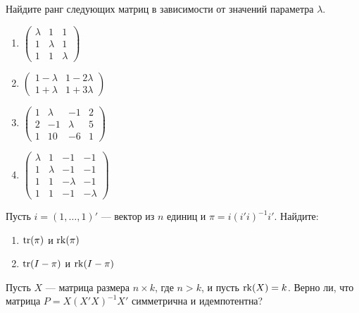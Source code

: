 \documentclass[pdftex,11pt,openany]{book}\usepackage[]{graphicx}\usepackage[]{color}
\begin{document}
\begin{solution}
\end{solution}


\begin{problem}
Найдите ранг следующих матриц в зависимости от значений параметра $\lambda$.

\begin{enumerate}
\item $\begin{pmatrix} \lambda & 1 & 1 \\ 1 & \lambda & 1 \\ 1 & 1 & \lambda \end{pmatrix}$
\item $\begin{pmatrix} 1-\lambda & 1-2\lambda \\ 1+\lambda & 1+3\lambda \end{pmatrix}$
\item $\begin{pmatrix} 1 & \lambda & -1 & 2 \\ 2 & -1 & \lambda & 5 \\ 1 & 10 & -6 & 1 \end{pmatrix}$
\item $\begin{pmatrix} \lambda & 1 & -1 & -1 \\ 1 & \lambda & -1 & -1 \\ 1 & 1 & -\lambda & -1
\\ 1 & 1 & -1 & -\lambda \end{pmatrix}$
\end{enumerate}
\end{problem}


\begin{solution}
\end{solution}



\begin{problem}
Пусть $i = (1,\dots,1)'$ --- вектор из $n$ единиц и $\pi=i(i'i)^{-1}i'$. Найдите:
\begin{enumerate}
\item $\operatorname{tr}(\pi)$ и $\operatorname{rk}(\pi)$
\item $\operatorname{tr}(I-\pi)$ и $\operatorname{rk}(I-\pi)$
\end{enumerate}
\end{problem}

\begin{solution}
\end{solution}

\begin{problem}
Пусть $X$ --- матрица размера ${n \times k}$, где $n > k$, и пусть $\operatorname{rk}(X) = k$. Верно ли, что матрица $P = X(X'X)^{-1}X'$ симметрична и идемпотентна?
\end{problem}
\end{document}
